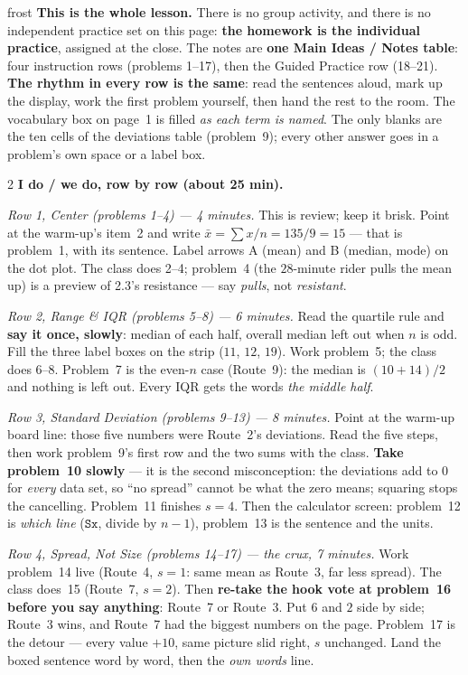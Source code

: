 \documentclass[10pt]{article}
\begin{document}
\boxguard
\begin{skillbox}{frost}
\textbf{This is the whole lesson.} There is no group activity, and there is no independent
practice set on this page: \textbf{the homework is the individual practice}, assigned at the
close. The notes are \textbf{one Main Ideas / Notes table}: four instruction rows (problems
1--17), then the Guided Practice row (18--21). \textbf{The rhythm in every row is the same}: read
the sentences aloud, mark up the display, work the first problem yourself, then hand the rest to
the room. The vocabulary box on page~1 is filled \emph{as each term is named}. The only blanks
are the ten cells of the deviations table (problem~9); every other answer goes in a problem's
own space or a label box.
\begin{multicols}{2}
\textbf{I do / we do, row by row (about 25 min).}

\emph{Row 1, Center (problems 1--4) --- 4 minutes.} This is review; keep it brisk. Point at the
warm-up's item~2 and write $\bar{x} = \sum x / n = 135/9 = 15$ --- that is problem~1, with its
sentence. Label arrows A (mean) and B (median, mode) on the dot plot. The class does 2--4;
problem~4 (the $28$-minute rider pulls the mean up) is a preview of 2.3's resistance --- say
\emph{pulls}, not \emph{resistant}.

\emph{Row 2, Range \& IQR (problems 5--8) --- 6 minutes.} Read the quartile rule and \textbf{say it
once, slowly}: median of each half, overall median left out when $n$ is odd. Fill the three
label boxes on the strip ($11$, $12$, $19$). Work problem~5; the class does 6--8. Problem~7 is the
even-$n$ case (Route~9): the median is $(10+14)/2$ and nothing is left out. Every IQR gets the
words \emph{the middle half}.

\emph{Row 3, Standard Deviation (problems 9--13) --- 8 minutes.} Point at the warm-up board line:
those five numbers were Route~2's deviations. Read the five steps, then work problem~9's first row
and the two sums with the class. \textbf{Take problem~10 slowly} --- it is the second
misconception: the deviations add to $0$ for \emph{every} data set, so ``no spread'' cannot be
what the zero means; squaring stops the cancelling. Problem~11 finishes $s = 4$. Then the
calculator screen: problem~12 is \emph{which line} ($\texttt{Sx}$, divide by $n - 1$), problem~13 is
the sentence and the units.

\emph{Row 4, Spread, Not Size (problems 14--17) --- the crux, 7 minutes.} Work problem~14 live
(Route~4, $s = 1$: same mean as Route~3, far less spread). The class does~15 (Route~7, $s = 2$).
Then \textbf{re-take the hook vote at problem~16 before you say anything}: Route~7 or Route~3.
Put $6$ and $2$ side by side; Route~3 wins, and Route~7 had the biggest numbers on the page.
Problem~17 is the detour --- every value $+10$, same picture slid right, $s$ unchanged. Land the
boxed sentence word by word, then the \emph{own words} line.


\end{multicols}
\end{skillbox}
\end{document}
